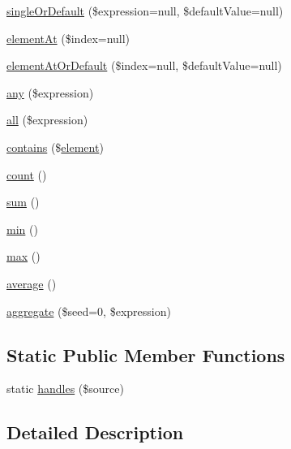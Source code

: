 \begin{DoxyCompactItemize}
\item 
\hyperlink{interface_p_h_p_linq___i_linq_provider_a204daca32909a6031584dcd308be29e0}{single\-Or\-Default} (\$expression=null, \$default\-Value=null)
\item 
\hyperlink{interface_p_h_p_linq___i_linq_provider_aed8dd8dd04c924a6e7c9626f29f537df}{element\-At} (\$index=null)
\item 
\hyperlink{interface_p_h_p_linq___i_linq_provider_ada7377d6eff2a6ad171c0616ec6271b8}{element\-At\-Or\-Default} (\$index=null, \$default\-Value=null)
\item 
\hyperlink{interface_p_h_p_linq___i_linq_provider_a658a448c5998940e8d7f21a351403439}{any} (\$expression)
\item 
\hyperlink{interface_p_h_p_linq___i_linq_provider_a74f8883392f4b48edb0fcd7aa05f3944}{all} (\$expression)
\item 
\hyperlink{interface_p_h_p_linq___i_linq_provider_a13c5d8a1f5c3552eea74839799acebab}{contains} (\$\hyperlink{bug-904820_8php_aa94081298ab2dfd0f261cce6c203d9aa}{element})
\item 
\hyperlink{interface_p_h_p_linq___i_linq_provider_ac751e87b3d4c4bf2feb03bee8b092755}{count} ()
\item 
\hyperlink{interface_p_h_p_linq___i_linq_provider_adce2d1b0fc342d86c949a3588b78ebe6}{sum} ()
\item 
\hyperlink{interface_p_h_p_linq___i_linq_provider_a0bb962b33915e2c1a507e95798a453a6}{min} ()
\item 
\hyperlink{interface_p_h_p_linq___i_linq_provider_aa53a1564d7748b63ad507d7136c852fb}{max} ()
\item 
\hyperlink{interface_p_h_p_linq___i_linq_provider_a8fa5690da6dbfe97e5f2ebfda9dc997f}{average} ()
\item 
\hyperlink{interface_p_h_p_linq___i_linq_provider_a6b6ca639b69217bb6d4f12a8a3fcbf44}{aggregate} (\$seed=0, \$expression)
\end{DoxyCompactItemize}
\subsection*{\-Static \-Public \-Member \-Functions}
\begin{DoxyCompactItemize}
\item 
static \hyperlink{interface_p_h_p_linq___i_linq_provider_a9cac44c1999a5e76809136f13aa20639}{handles} (\$source)
\end{DoxyCompactItemize}


\subsection{\-Detailed \-Description}


